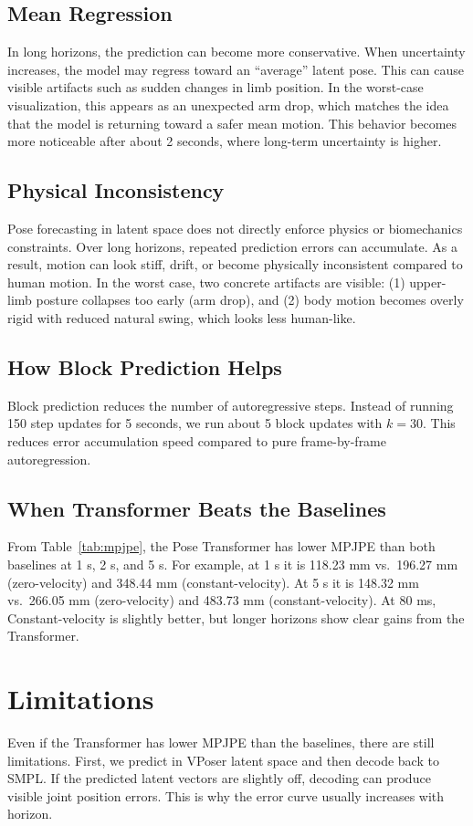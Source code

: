 \documentclass[10pt,twocolumn]{article}
\begin{document}
\subsection{Mean Regression}
In long horizons, the prediction can become more conservative.
When uncertainty increases, the model may regress toward an ``average'' latent pose.
This can cause visible artifacts such as sudden changes in limb position.
In the worst-case visualization, this appears as an unexpected arm drop, which matches the idea that the model is returning toward a safer mean motion.
This behavior becomes more noticeable after about 2 seconds, where long-term uncertainty is higher.

\subsection{Physical Inconsistency}
Pose forecasting in latent space does not directly enforce physics or biomechanics constraints.
Over long horizons, repeated prediction errors can accumulate.
As a result, motion can look stiff, drift, or become physically inconsistent compared to human motion.
In the worst case, two concrete artifacts are visible: (1) upper-limb posture collapses too early (arm drop), and
(2) body motion becomes overly rigid with reduced natural swing, which looks less human-like.

\subsection{How Block Prediction Helps}
Block prediction reduces the number of autoregressive steps.
Instead of running 150 step updates for 5 seconds, we run about 5 block updates with $k=30$.
This reduces error accumulation speed compared to pure frame-by-frame autoregression.

\subsection{When Transformer Beats the Baselines}
From Table~\ref{tab:mpjpe}, the Pose Transformer has lower MPJPE than both baselines at 1 s, 2 s, and 5 s.
For example, at 1 s it is 118.23 mm vs.\ 196.27 mm (zero-velocity) and 348.44 mm (constant-velocity).
At 5 s it is 148.32 mm vs.\ 266.05 mm (zero-velocity) and 483.73 mm (constant-velocity).
At 80 ms, Constant-velocity is slightly better, but longer horizons show clear gains from the Transformer.

\section{Limitations}
Even if the Transformer has lower MPJPE than the baselines, there are still limitations.
First, we predict in VPoser latent space and then decode back to SMPL.
If the predicted latent vectors are slightly off, decoding can produce visible joint position errors.
This is why the error curve usually increases with horizon.
\end{document}
